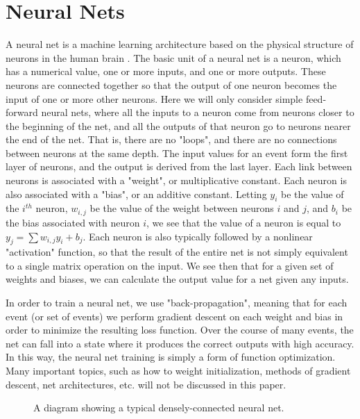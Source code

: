\section{Neural Nets}

A neural net is a machine learning architecture based on the physical structure of neurons in the human brain \cite{neural_net}. The basic unit of a neural net is a neuron, which has a numerical value, one or more inputs, and one or more outputs. These neurons are connected together so that the output of one neuron becomes the input of one or more other neurons. Here we will only consider simple feed-forward neural nets, where all the inputs to a neuron come from neurons closer to the beginning of the net, and all the outputs of that neuron go to neurons nearer the end of the net. That is, there are no "loops", and there are no connections between neurons at the same depth. The input values for an event form the first layer of neurons, and the output is derived from the last layer. Each link between neurons is associated with a "weight", or multiplicative constant. Each neuron is also associated with a "bias", or an additive constant. Letting $y_i$ be the value of the $i^{th}$ neuron, $w_{i,j}$ be the value of the weight between neurons $i$ and $j$, and $b_i$ be the bias associated with neuron $i$, we see that the value of a neuron is equal to $y_j = \sum{w_{i,j}y_i} + b_j$. Each neuron is also typically followed by a nonlinear "activation" function, so that the result of the entire net is not simply equivalent to a single matrix operation on the input. We see then that for a given set of weights and biases, we can calculate the output value for a net given any inputs.

In order to train a neural net, we use "back-propagation", meaning that for each event (or set of events) we perform gradient descent on each weight and bias in order to minimize the resulting loss function. Over the course of many events, the net can fall into a state where it produces the correct outputs with high accuracy. In this way, the neural net training is simply a form of function optimization. Many important topics, such as how to weight initialization, methods of gradient descent, net architectures, etc. will not be discussed in this paper.

\begin{figure}[t]
    \centering
    \caption{A diagram showing a typical densely-connected neural net.}
    \label{neural_net}
\end{figure}

